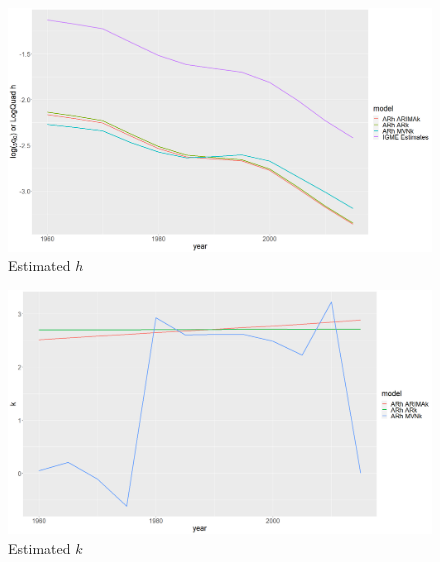 \documentclass[12pt,a4paper]{article}
\begin{document}
\newpage
\begin{figure}[H]
\includegraphics[width = \linewidth]{Burkina Faso/5/h.jpg}
\caption{Estimated $h$}
\end{figure}
\begin{figure}[H]
\includegraphics[width = \linewidth]{Burkina Faso/5/k.jpg}
\caption{Estimated $k$}
\end{figure}
\end{document}
